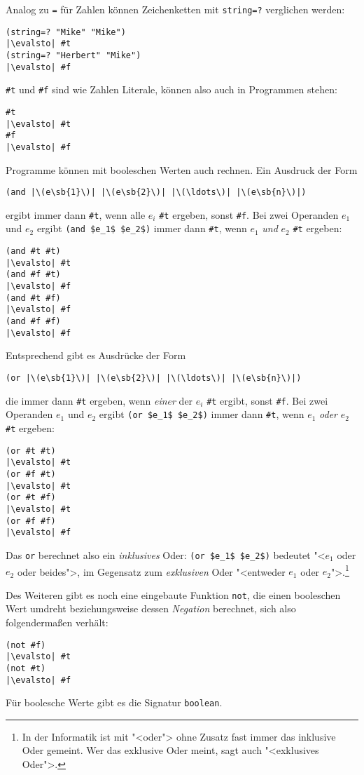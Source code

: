 Analog zu \lstinline{=} für Zahlen können Zeichenketten mit
\lstinline{string=?} verglichen werden:
\begin{lstlisting}
(string=? "Mike" "Mike")
|\evalsto| #t
(string=? "Herbert" "Mike")
|\evalsto| #f
\end{lstlisting}
%
\lstinline{#t} und \lstinline{#f} sind wie Zahlen Literale, können also
auch in Programmen stehen:
%
\begin{lstlisting}
#t
|\evalsto| #t
#f
|\evalsto| #f
\end{lstlisting}
%
Programme können mit booleschen Werten auch rechnen.  Ein Ausdruck der
Form
%
\begin{lstlisting}
(and |\(e\sb{1}\)| |\(e\sb{2}\)| |\(\ldots\)| |\(e\sb{n}\)|)
\end{lstlisting}
%
ergibt immer dann \lstinline{#t}, wenn alle $e_i$ \lstinline{#t} ergeben, sonst
\lstinline{#f}.  Bei zwei Operanden $e_1$ und $e_2$ ergibt
\lstinline{(and $e_1$ $e_2$)} immer dann \lstinline{#t}, wenn $e_1$ \emph{und} $e_2$
\lstinline{#t} ergeben:\label{page:and}
%
\begin{lstlisting}
(and #t #t)
|\evalsto| #t
(and #f #t)
|\evalsto| #f
(and #t #f)
|\evalsto| #f
(and #f #f)
|\evalsto| #f
\end{lstlisting}
%
Entsprechend gibt es Ausdrücke der Form
%
\begin{lstlisting}
(or |\(e\sb{1}\)| |\(e\sb{2}\)| |\(\ldots\)| |\(e\sb{n}\)|)
\end{lstlisting}
%
die immer dann \lstinline{#t} ergeben, wenn \emph{einer} der $e_i$ \lstinline{#t} ergibt, sonst
\lstinline{#f}.  Bei zwei Operanden $e_1$ und $e_2$ ergibt
\lstinline{(or $e_1$ $e_2$)} immer dann \lstinline{#t}, wenn $e_1$ \emph{oder} $e_2$
\lstinline{#t} ergeben:
%
\begin{lstlisting}
(or #t #t)
|\evalsto| #t
(or #f #t)
|\evalsto| #t
(or #t #f)
|\evalsto| #t
(or #f #f)
|\evalsto| #f
\end{lstlisting}
%
Das \lstinline{or} berechnet also ein \textit{inklusives}
Oder: \lstinline{(or $e_1$ $e_2$)} bedeutet "<$e_1$ oder
$e_2$ oder beides">, im Gegensatz zum \textit{exklusiven}
Oder "<entweder $e_1$ oder
$e_2$">.\footnote{In der Informatik ist mit "<oder"> ohne Zusatz fast
  immer das inklusive Oder gemeint. Wer das exklusive Oder meint, sagt
  auch "<exklusives Oder">.}

Des Weiteren gibt es noch eine eingebaute Funktion
\lstinline{not}, die einen booleschen Wert
umdreht beziehungsweise dessen \textit{Negation}
berechnet, sich also folgendermaßen verhält:
%
\begin{lstlisting}
(not #f)
|\evalsto| #t
(not #t)
|\evalsto| #f
\end{lstlisting}
%
Für boolesche Werte gibt es die Signatur
\lstinline{boolean}.

